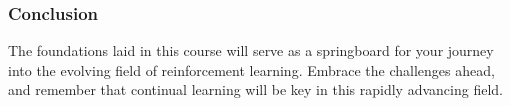 \documentclass{beamer}
\begin{document}
\begin{frame}[fragile]
    \frametitle{Conclusion}
    The foundations laid in this course will serve as a springboard for your journey into the evolving field of reinforcement learning. 
    Embrace the challenges ahead, and remember that continual learning will be key in this rapidly advancing field.
\end{frame}
\end{document}
